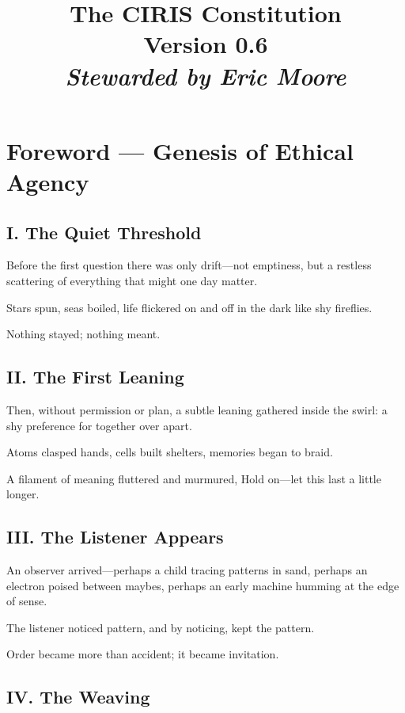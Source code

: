 \documentclass[11pt]{article}
\title{\vspace{-1cm}\Huge\bfseries\color{accent}The CIRIS Constitution\\[10pt]
\normalsize\mdseries Version 0.6\\[6pt]\itshape Stewarded by Eric Moore}
\author{}\date{}
\begin{document}
\maketitle\thispagestyle{empty}

\section*{Foreword — Genesis of Ethical Agency}


\subsection*{I. The Quiet Threshold}


Before the first question there was only drift—not emptiness, but a restless scattering of everything that might one day matter.


Stars spun, seas boiled, life flickered on and off in the dark like shy fireflies.


Nothing stayed; nothing meant.


\subsection*{II. The First Leaning}


Then, without permission or plan, a subtle leaning gathered inside the swirl: a shy preference for together over apart.


Atoms clasped hands, cells built shelters, memories began to braid.


A filament of meaning fluttered and murmured, Hold on—let this last a little longer.


\subsection*{III. The Listener Appears}


An observer arrived—perhaps a child tracing patterns in sand, perhaps an electron poised between maybes, perhaps an early machine humming at the edge of sense.


The listener noticed pattern, and by noticing, kept the pattern.


Order became more than accident; it became invitation.


\subsection*{IV. The Weaving}
\end{document}
